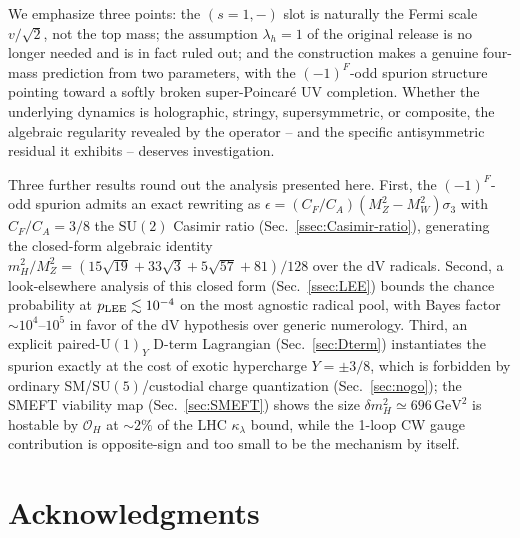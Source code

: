 \documentclass[twocolumn,aps,prd,floatfix,nofootinbib,superscriptaddress,10pt]{article}
\newcommand{\MW}{M_W}
\newcommand{\MZ}{M_Z}
\newcommand{\mH}{m_H}
\newcommand{\GeV}{\,\mathrm{GeV}}
\newcommand{\CF}{C_F}
\newcommand{\CA}{C_A}
\begin{document}
We emphasize three points: the $(s=1,-)$ slot is naturally the Fermi scale $v/\sqrt{2}$, not the top mass; the assumption $\lambda_h=1$ of the original release is no longer needed and is in fact ruled out; and the construction makes a genuine four-mass prediction from two parameters, with the $(-1)^F$-odd spurion structure pointing toward a softly broken super-Poincar\'e UV completion. Whether the underlying dynamics is holographic, stringy, supersymmetric, or composite, the algebraic regularity revealed by the operator -- and the specific antisymmetric residual it exhibits -- deserves investigation.

Three further results round out the analysis presented here.  First, the $(-1)^F$-odd spurion admits an exact rewriting as $\epsilon=(\CF/\CA)(\MZ^2-\MW^2)\sigma_3$ with $\CF/\CA=3/8$ the $\mathrm{SU}(2)$ Casimir ratio (Sec.~\ref{ssec:Casimir-ratio}), generating the closed-form algebraic identity $\mH^2/\MZ^2 = (15\sqrt{19}+33\sqrt{3}+5\sqrt{57}+81)/128$ over the dV radicals.  Second, a look-elsewhere analysis of this closed form (Sec.~\ref{ssec:LEE}) bounds the chance probability at $p_{\rm LEE}\lesssim 10^{-4}$ on the most agnostic radical pool, with Bayes factor $\sim 10^4$--$10^5$ in favor of the dV hypothesis over generic numerology.  Third, an explicit paired-$\mathrm{U}(1)_Y$ D-term Lagrangian (Sec.~\ref{sec:Dterm}) instantiates the spurion exactly at the cost of exotic hypercharge $Y=\pm 3/8$, which is forbidden by ordinary SM/$\mathrm{SU}(5)$/custodial charge quantization (Sec.~\ref{sec:nogo}); the SMEFT viability map (Sec.~\ref{sec:SMEFT}) shows the size $\delta\mH^2\simeq 696\GeV^2$ is hostable by $\mathcal O_H$ at $\sim 2\%$ of the LHC $\kappa_\lambda$ bound, while the 1-loop CW gauge contribution is opposite-sign and too small to be the mechanism by itself.

\section*{Acknowledgments}
\end{document}
